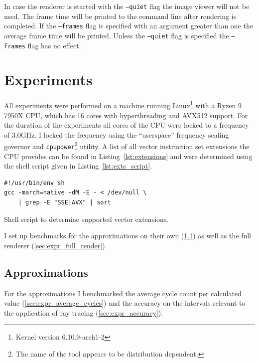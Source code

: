 \documentclass[a4paper, 11pt]{memoir}
\begin{document}
    In case the renderer is started with the \texttt{--quiet} flag the image viewer will not be used. The frame
    time will be printed to the command line after rendering is completed. If the \texttt{--frames} flag is
    specified with an argument greater than one the average frame time will be printed. Unless the \texttt{--quiet}
    flag is specified the \texttt{--frames} flag has no effect.

    \chapter{Experiments}
    \label{ch:experiments}
    
    All experiments were performed on a machine running Linux\footnote{Kernel version 6.10.9-arch1-2} with a Ryzen 9
    7950X CPU, which has 16 cores with hyperthreading and AVX512 support. For the duration of the experiments all cores
    of the CPU were locked to a frequency of $3.0$GHz. I locked the frequency using the \enquote{userspace} frequency
    scaling governor and \texttt{cpupower}\footnote{The name of the tool appears to be distribution dependent.}
    utility. A list of all vector instruction set extensions the CPU provides can be found in Listing~\ref{lst:extensions}
    and were determined using the shell script given in Listing~\ref{lst:exts_script}.
    \begin{listing}[t]
        \begin{verbatim}
#!/usr/bin/env sh
gcc -march=native -dM -E - < /dev/null \
    | grep -E "SSE|AVX" | sort
        \end{verbatim}
        \caption{Shell script to determine supported vector extensions.}
        \label{lst:exts_script}
    \end{listing}

    I set up benchmarks for the approximations on their own (\ref{sec:expr_approx}) as well as the full renderer
    (\ref{sec:expr_full_render}).

    \section{Approximations}
    \label{sec:expr_approx}
    For the approximations I benchmarked the average cycle count per calculated value (\ref{sec:expr_average_cycles}) and
    the accuracy on the intervals relevant to the application of ray tracing (\ref{sec:expr_accuracy}).
\end{document}

